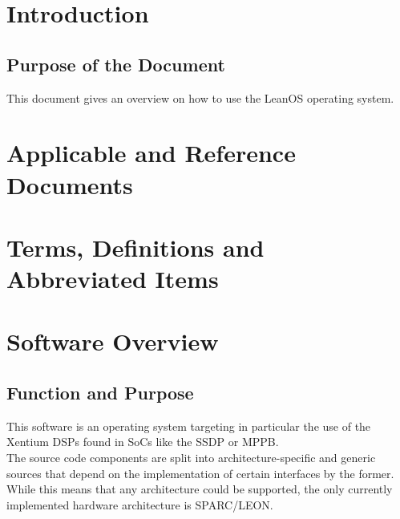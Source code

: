\begin{versionhistory}
\end{versionhistory}


\chapter{Introduction}

\section{Purpose of the Document}

This document gives an overview on how to use the LeanOS operating system.

\chapter{Applicable and Reference Documents} %

\printbibliography[heading=none]


\chapter{Terms, Definitions and Abbreviated Items}
\printglossary[type=acronym]
\printglossary[type=main, style=altlist]



\chapter{Software Overview}

\section{Function and Purpose}

This software is an operating system targeting in particular the use of the
Xentium DSPs found in \glspl{SoC} like the \gls{SSDP} or \gls{MPPB}.
\\

The source code components are split into architecture-specific and generic
sources that depend on the implementation of certain interfaces by the former.
While this means that any architecture could be supported, the only
currently implemented hardware architecture is SPARC/LEON.


